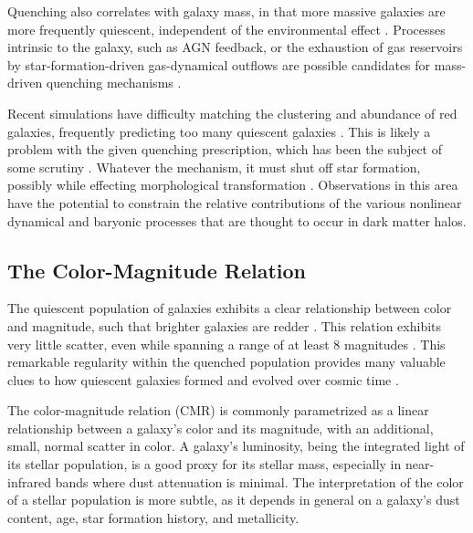 Quenching also correlates with galaxy mass, in that more massive galaxies are more frequently quiescent, independent of the environmental effect \citep{Kauffmann:2004aa,Baldry:2006aa,Peng:2010aa}.
Processes intrinsic to the galaxy, such as AGN feedback, or the exhaustion of gas reservoirs by star-formation-driven gas-dynamical outflows are possible candidates for mass-driven quenching mechanisms \citep{McGee:2014aa,Balogh:2016aa}.

Recent simulations have difficulty matching the clustering and abundance of red galaxies, frequently predicting too many quiescent galaxies \citep{Coil:2008aa,Weinmann:2011aa,Vulcani:2014aa}.
This is likely a problem with the given quenching prescription, which has been the subject of some scrutiny \citep{McGee:2009aa,McGee:2011aa,Balogh:2016aa}.
Whatever the mechanism, it must shut off star formation, possibly while effecting morphological transformation \citep{Dressler:1980aa}.
Observations in this area have the potential to constrain the relative contributions of the various nonlinear dynamical and baryonic processes that are thought to occur in dark matter halos.

\subsection{The Color-Magnitude Relation}

The quiescent population of galaxies exhibits a clear relationship between color and magnitude, such that brighter galaxies are redder \citep{Bower:1992mb,van-Dokkum:1998wd,Baldry:2004aa,Bell:2004qe}.
This relation exhibits very little scatter, even while spanning a range of at least 8 magnitudes \citep{Baldry:2004aa}.
This remarkable regularity within the quenched population provides many valuable clues to how quiescent galaxies formed and evolved over cosmic time \citep{Bower:1992mb,Peebles:2002aa}.

The color-magnitude relation (CMR) is commonly parametrized as a linear relationship between a galaxy's color and its magnitude, with an additional, small, normal scatter in color.
A galaxy's luminosity, being the integrated light of its stellar population, is a good proxy for its stellar mass, especially in near-infrared bands where dust attenuation is minimal.
The interpretation of the color of a stellar population is more subtle, as it depends in general on a galaxy's dust content, age, star formation history, and metallicity.

